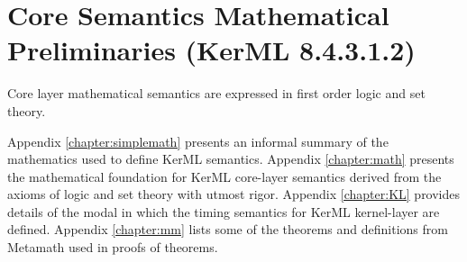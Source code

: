 


%
%


\section{Core Semantics Mathematical Preliminaries (KerML 8.4.3.1.2)}\label{8.4.3.1.2}

\pn %
Core layer mathematical semantics are expressed in first order logic and set theory.

Appendix \ref{chapter:simplemath} presents an informal summary of the mathematics used to define KerML semantics.  Appendix \ref{chapter:math} presents the mathematical foundation for KerML core-layer semantics derived from the axioms of logic and set theory with utmost rigor.  Appendix \ref{chapter:KL} provides details of the modal in which the timing semantics for KerML kernel-layer are defined.  Appendix \ref{chapter:mm} lists some of the theorems and definitions from Metamath used in proofs of theorems.

%


